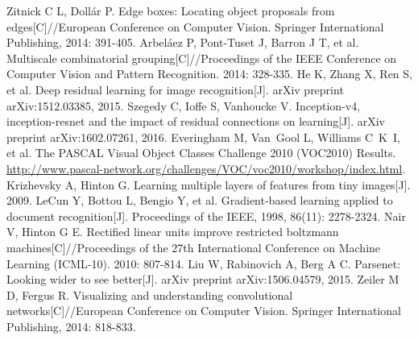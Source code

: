\begin{thebibliography}{148}
Zitnick C L, Dollár P. Edge boxes: Locating object proposals from edges[C]//European Conference on Computer Vision. Springer International Publishing, 2014: 391-405.
Arbeláez P, Pont-Tuset J, Barron J T, et al. Multiscale combinatorial grouping[C]//Proceedings of the IEEE Conference on Computer Vision and Pattern Recognition. 2014: 328-335.
He K, Zhang X, Ren S, et al. Deep residual learning for image recognition[J]. arXiv preprint arXiv:1512.03385, 2015.
Szegedy C, Ioffe S, Vanhoucke V. Inception-v4, inception-resnet and the impact of residual connections on learning[J]. arXiv preprint arXiv:1602.07261, 2016.
Everingham M, Van~Gool L, Williams C~K~I, et al. The {PASCAL} {V}isual {O}bject {C}lasses {C}hallenge 2010 {(VOC2010)}
{R}esults. \url{http://www.pascal-network.org/challenges/VOC/voc2010/workshop/index.html}.
Krizhevsky A, Hinton G. Learning multiple layers of features from tiny images[J]. 2009.
LeCun Y, Bottou L, Bengio Y, et al. Gradient-based learning applied to document recognition[J]. Proceedings of the IEEE, 1998, 86(11): 2278-2324.
Nair V, Hinton G E. Rectified linear units improve restricted boltzmann machines[C]//Proceedings of the 27th International Conference on Machine Learning (ICML-10). 2010: 807-814.
Liu W, Rabinovich A, Berg A C. Parsenet: Looking wider to see better[J]. arXiv preprint arXiv:1506.04579, 2015.
Zeiler M D, Fergus R. Visualizing and understanding convolutional networks[C]//European Conference on Computer Vision. Springer International Publishing, 2014: 818-833.


\end{thebibliography}
